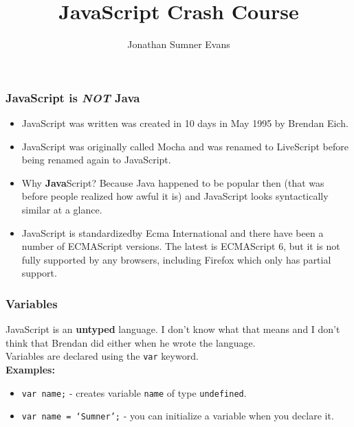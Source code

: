 \documentclass{lug}
\title{JavaScript Crash Course}
\author{Jonathan Sumner Evans}
\begin{document}
\begin{frame}
    \frametitle{JavaScript is \textbf{\textit{NOT}} Java \footnotemark[1]}

    \begin{itemize}[<+->]
        \item JavaScript was written was created in 10 days in May 1995 by Brendan Eich.
        \item JavaScript was originally called Mocha and was renamed to LiveScript before being
            renamed again to JavaScript.
        \item Why \textbf{Java}Script? Because Java happened to be popular then (that was before
            people realized how awful it is) and JavaScript looks syntactically similar at a glance.
        \item JavaScript is standardized\footnotemark[2] by Ecma International and there have been a
            number of ECMAScript versions. The latest is ECMAScript 6, but it is not fully supported
            by any browsers, including Firefox which only has partial support.
    \end{itemize}

\end{frame}

\begin{frame}
    \frametitle{Variables}

    JavaScript is an \textbf{untyped} language. I don't know what that means and I don't
    think that Brendan did either when he wrote the language.\\

    Variables are declared using the \texttt{var} keyword\footnotemark[1]. \\

    \textbf{Examples:}

    \begin{itemize}
        \item \texttt{var name;} - creates variable \texttt{name} of type \texttt{undefined}.
        \item \texttt{var name = `Sumner';} - you can initialize a variable when you declare it.
    \end{itemize}

\end{frame}
\end{document}
